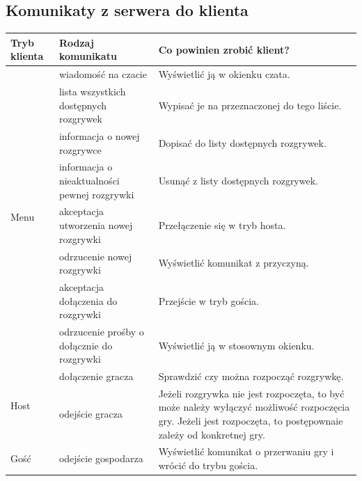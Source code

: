 \documentclass[a4paper, 12pt]{article}
\begin{document}
\subsection{Komunikaty z serwera do klienta}
\begin{center}
 \begin{tabular}{p{1.3cm}||p{5.2cm}||p{7cm}}
 \hbox{Tryb} klienta& Rodzaj komunikatu & Co powinien zrobić klient?\\ \hline \hline
\multirow{8}{*}{Menu}
  & wiadomość na czacie
  & Wyświetlić ją w okienku czata. \\ \cline{2-3}

  & lista wszystkich dostępnych rozgrywek
  & Wypisać je na przeznaczonej do tego liście. \\ \cline{2-3}

  & informacja o nowej rozgrywce
  & Dopisać do listy dostępnych rozgrywek. \\ \cline{2-3}

  & informacja o nieaktualności pewnej rozgrywki\footnotemark
  & Usunąć z listy dostępnych rozgrywek. \\ \cline{2-3}

  & akceptacja utworzenia nowej rozgrywki
  & Przełączenie się w tryb hosta. \\ \cline{2-3}

  & odrzucenie nowej rozgrywki\footnotemark
  & Wyświetlić komunikat z przyczyną. \\ \cline{2-3}

  & akceptacja dołączenia do rozgrywki 
  & Przejście w tryb gościa. \\ \cline{2-3}

  & odrzucenie prośby o dołącznie do rozgrywki\footnotemark
  & Wyświetlić ją w stosownym okienku. \\ \hline \hline

\multirow{2}{*}{Host}
  & dołączenie gracza
  & Sprawdzić czy można rozpocząć rozgrywkę. \\ \cline{2-3}

  & odejście gracza
  & Jeżeli rozgrywka nie jest rozpoczęta, to być może należy wyłączyć możliwość rozpoczęcia gry. Jeżeli jest rozpoczęta, to postępownaie zależy od konkretnej gry. \\ \hline \hline

  Gość
  & odejście gospodarza
  & Wyświetlić komunikat o przerwaniu gry i wrócić do trybu gościa. \\ \hline \hline
\end{tabular}
\end{center}
\end{document}
